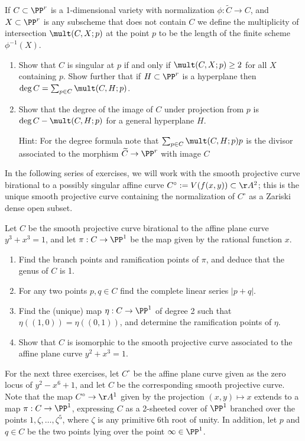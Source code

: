 \begin{exercise}
If $C\subset \PP^r$ is a 1-dimensional variety with normalization $\phi: \widetilde C\to C$, and $X\subset \PP^r$ is any subscheme that does
not contain $C$
we define the multiplicity of intersection $\mult(C,X;p)$ at the point $p$ to be the length of the finite scheme $\phi^{-1}(X)$.
\begin{enumerate}
\item Show that $C$ is singular at $p$ if and only if $\mult(C,X;p) \geq 2$ for all $X$ containing $p$. Show further that if $H\subset \PP^r$ 
is a hyperplane then
 $\deg C = \sum_{p\in C} \mult(C,H;p)$. 
 \item Show that the degree of the image of $C$ under projection from $p$
 is $\deg C - \mult(C,H;p)$ for a general hyperplane $H$.
 
Hint: For the degree formula note that $\sum_{p\in C} \mult(C,H;p) p$ is the divisor associated to the morphism $\widetilde C \to \PP^r$ with image $C$
\end{enumerate}

\end{exercise}

In the following series of exercises, we will work with the smooth projective curve birational to a possibly singular affine curve $C^\circ := V(f(x,y)) \subset \AA^2$; this is the unique smooth projective curve containing the normalization of $C^\circ$ as a Zariski dense open subset.

\begin{exercise}
Let $C$ be the smooth projective curve birational to the affine plane curve $y^3 +x^3 = 1$, and let $\pi : C \to \PP^1$ be the map given by the rational function $x$.
\begin{enumerate}
\item Find the branch points and ramification points of $\pi$, and deduce that the genus of $C$ is 1.
\item For any two points $p, q \in C$ find the complete linear series $|p+q|$.
\item Find the (unique) map $\eta : C \to \PP^1$ of degree 2 such that $\eta((1,0)) = \eta((0,1))$, and determine the ramification points of $\eta$.
\item Show that $C$ is isomorphic to the smooth projective curve associated to the affine plane curve $y^2 +x^3 = 1$.
\end{enumerate}
\end{exercise}

For the next three exercises, let $C^\circ$ be the affine plane curve given as the zero locus of $y^2 - x^6 +1$, and let $C$ be the corresponding smooth projective curve. Note that the map $C^\circ \to \AA^1$ given by the projection $(x,y) \mapsto x$ extends to a map $\pi : C \to \PP^1$, expressing $C$ as a 2-sheeted cover of $\PP^1$ branched over the points $1, \zeta, \dots, \zeta^5$, where $\zeta$ is any primitive 6th root of unity. In addition, let $p$ and $q \in C$ be the two points lying over the point $\infty \in \PP^1$.

